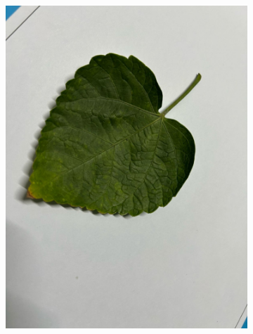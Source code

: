 \documentclass[twocolumn]{article}
\begin{document}
\begin{figure}[H]
    \begin{subfigure}[b]{0.30\columnwidth}
        \includegraphics[width=\textwidth]{rosa7}
    \end{subfigure}
    \hfill
    \begin{subfigure}[b]{0.30\columnwidth}

\end{subfigure}
\end{figure}
\end{document}
